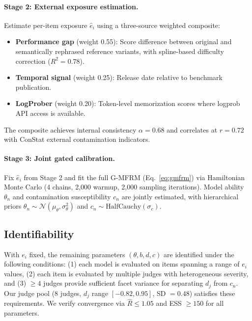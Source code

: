 \documentclass[11pt]{article}
\newcommand{\gmfrm}{\textsc{G-MFRM}}
\newcommand{\ei}{e_i}
\newcommand{\cn}{c_n}
\newcommand{\djud}{d_j}
\begin{document}
\paragraph{Stage 2: External exposure estimation.} Estimate per-item exposure $\hat{e}_i$ using a three-source weighted composite:
\begin{itemize}[nosep,leftmargin=*]
\item \textbf{Performance gap} (weight 0.55): Score difference between original and semantically rephrased reference variants, with spline-based difficulty correction ($R^2 = 0.78$).
\item \textbf{Temporal signal} (weight 0.25): Release date relative to benchmark publication.
\item \textbf{LogProber} (weight 0.20): Token-level memorization scores where logprob API access is available.
\end{itemize}
The composite achieves internal consistency $\alpha = 0.68$ and correlates at $r = 0.72$ with ConStat external contamination indicators.

\paragraph{Stage 3: Joint gated calibration.} Fix $\hat{e}_i$ from Stage 2 and fit the full \gmfrm{} (Eq.~\ref{eq:gmfrm}) via Hamiltonian Monte Carlo (4 chains, 2{,}000 warmup, 2{,}000 sampling iterations). Model ability $\theta_n$ and contamination susceptibility $\cn$ are jointly estimated, with hierarchical priors $\theta_n \sim \mathcal{N}(\mu_\theta, \sigma_\theta^2)$ and $\cn \sim \text{HalfCauchy}(\sigma_c)$.

\subsection{Identifiability}

With $\ei$ fixed, the remaining parameters $(\theta, b, d, c)$ are identified under the following conditions: (1) each model is evaluated on items spanning a range of $\ei$ values, (2) each item is evaluated by multiple judges with heterogeneous severity, and (3) $\geq 4$ judges provide sufficient facet variance for separating $\djud$ from $\cn$. Our judge pool (8 judges, $\djud$ range $[-0.82, 0.95]$, SD $= 0.48$) satisfies these requirements. We verify convergence via $\hat{R} \leq 1.05$ and ESS $\geq 150$ for all parameters.

\end{document}
